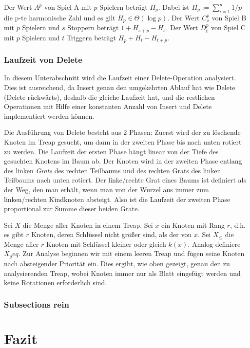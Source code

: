 \documentclass[a4paper]{scrreprt}
\theoremstyle{definition}
\begin{document}
Der Wert $A^p$ von Spiel A mit $p$ Spielern beträgt $H_p$. %
Dabei ist $H_p := \sum_{i=1}^p 1/p$ die p-te harmonische Zahl und es gilt $H_p \in \Theta(\log p)$. %
Der Wert $C_s^p$ von Spiel B mit $p$ Spielern und $s$ Stoppern beträgt $1 + H_{s+p} - H_s$.
Der  Wert $D_t^p$ von Spiel C mit $p$ Spielern und $t$ Triggern beträgt $H_p + H_t - H_{t+p}$.

\subsection{Laufzeit von Delete}
\label{sec:delruntime}
In diesem Unterabschnitt wird die Laufzeit einer Delete-Operation analysiert.
Dies ist ausreichend, da Insert genau den umgekehrten Ablauf hat wie Delete (\glqq Delete rückwärts\grqq), deshalb die gleiche Laufzeit hat, und die restlichen Operationen mit Hilfe einer konstanten Anzahl von Insert und Delete implementiert werden können. %

Die Ausführung von Delete besteht aus 2 Phasen:
Zuerst wird der zu löschende Knoten im Treap gesucht, um dann in der zweiten Phase bis nach unten rotiert zu werden.
Die Laufzeit der ersten Phase hängt linear von der Tiefe des gesuchten Knotens im Baum ab.
Der Knoten wird in der zweiten Phase entlang des linken \emph{Grats} des rechten Teilbaums und des rechten Grats des linken Teilbaums nach unten rotiert.
Der linke/rechte Grat eines Baums ist definiert als der Weg, den man erhält, wenn man von der Wurzel aus immer zum linken/rechten Kindknoten absteigt.
Also ist die Laufzeit der zweiten Phase proportional zur Summe dieser beiden Grate.

Sei $X$ die Menge aller Knoten in einem Treap.
Sei $x$ ein Knoten mit Rang $r$, d.h. es gibt $r$ Knoten, deren Schlüssel nicht größer sind, als der von $x$.
Sei $X_\leq$ die Menge aller $r$ Knoten mit Schlüssel kleiner oder gleich $k(x)$.
Analog definiere $X_geq$.
Zur Analyse beginnen wir mit einem leeren Treap und fügen seine Knoten nach absteigender Priorität ein.
Dies ergibt, wie oben gezeigt, genau den zu analysierenden Treap, wobei Knoten immer nur als Blatt eingefügt werden und keine Rotationen erforderlich sind.



\subsection{Subsections rein} %
\label{sec:section3}

\chapter{Fazit}
\label{sec:closing}



\end{document}
